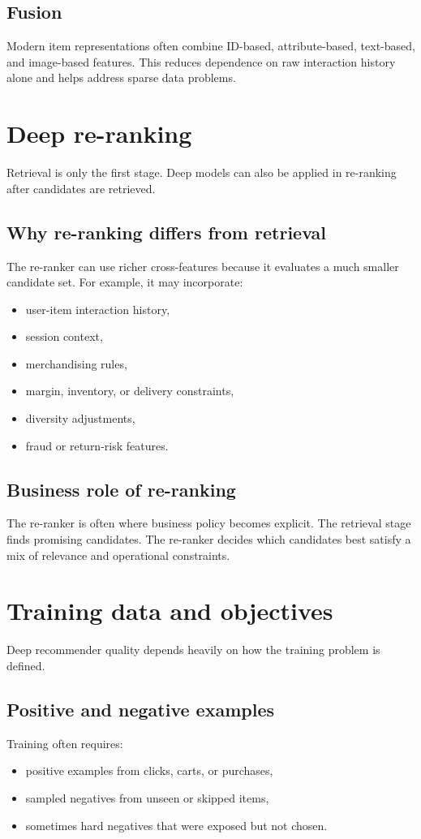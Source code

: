 \subsection{Fusion}
Modern item representations often combine ID-based, attribute-based, text-based, and image-based features.
This reduces dependence on raw interaction history alone and helps address sparse data problems.

\section{Deep re-ranking}
Retrieval is only the first stage.
Deep models can also be applied in re-ranking after candidates are retrieved.

\subsection{Why re-ranking differs from retrieval}
The re-ranker can use richer cross-features because it evaluates a much smaller candidate set.
For example, it may incorporate:
\begin{itemize}
  \item user-item interaction history,
  \item session context,
  \item merchandising rules,
  \item margin, inventory, or delivery constraints,
  \item diversity adjustments,
  \item fraud or return-risk features.
\end{itemize}

\subsection{Business role of re-ranking}
The re-ranker is often where business policy becomes explicit.
The retrieval stage finds promising candidates.
The re-ranker decides which candidates best satisfy a mix of relevance and operational constraints.

\section{Training data and objectives}
Deep recommender quality depends heavily on how the training problem is defined.

\subsection{Positive and negative examples}
Training often requires:
\begin{itemize}
  \item positive examples from clicks, carts, or purchases,
  \item sampled negatives from unseen or skipped items,
  \item sometimes hard negatives that were exposed but not chosen.
\end{itemize}


